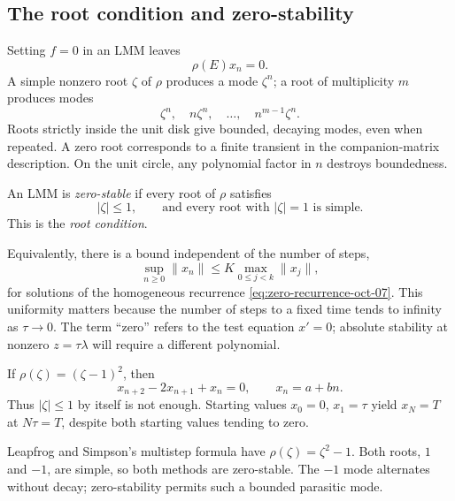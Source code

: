 \subsection{The root condition and zero-stability}

Setting \(f=0\) in an LMM leaves
\begin{equation}\label{eq:zero-recurrence-oct-07}
 \rho(E)x_n=0.
\end{equation}
A simple nonzero root \(\zeta\) of \(\rho\) produces a mode
\(\zeta^n\); a root of multiplicity \(m\) produces modes
\[
 \zeta^n,\quad n\zeta^n,\quad\ldots,\quad n^{m-1}\zeta^n.
\]
Roots strictly inside the unit disk give bounded, decaying modes,
even when repeated. A zero root corresponds to a finite transient
in the companion-matrix description. On the unit circle, any
polynomial factor in \(n\) destroys boundedness.

\begin{definition}
 An LMM is \emph{zero-stable} if every root of \(\rho\) satisfies
 \begin{equation}\label{eq:root-condition-oct-07}
  |\zeta|\leq1,
  \qquad\text{and every root with }|\zeta|=1\text{ is simple}.
 \end{equation}
 This is the \emph{root condition}.
\end{definition}

Equivalently, there is a bound independent of the number of steps,
\[
 \sup_{n\geq0}\|x_n\|
       \leq K\max_{0\leq j<k}\|x_j\|,
\]
for solutions of the homogeneous recurrence
\eqref{eq:zero-recurrence-oct-07}. This uniformity matters because
the number of steps to a fixed time tends to infinity as
\(\tau\to0\). The term ``zero'' refers to the test equation
\(x'=0\); absolute stability at nonzero \(z=\tau\lambda\) will
require a different polynomial.

\begin{example}
 If \(\rho(\zeta)=(\zeta-1)^2\), then
 \[
  x_{n+2}-2x_{n+1}+x_n=0,
  \qquad x_n=a+bn.
 \]
 Thus \(|\zeta|\leq1\) by itself is not enough. Starting values
 \(x_0=0\), \(x_1=\tau\) yield \(x_N=T\) at \(N\tau=T\),
 despite both starting values tending to zero.
\end{example}

\begin{example}
 Leapfrog and Simpson's multistep formula have
 \(\rho(\zeta)=\zeta^2-1\). Both roots, \(1\) and \(-1\),
 are simple, so both methods are zero-stable. The \(-1\) mode
 alternates without decay; zero-stability permits such a bounded
 parasitic mode.
\end{example}

